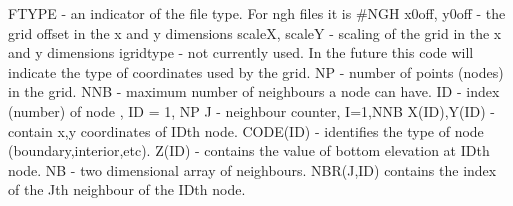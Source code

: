 \documentclass{article}
\begin{document}
\noindent
FTYPE - an indicator of the file type.  For ngh files it is \#NGH \newline
x0off, y0off - the grid offset in the x and y dimensions \newline
scaleX, scaleY - scaling of the grid in the x and y dimensions \newline
igridtype - not currently used.  In the future this code will indicate the type of coordinates used by the grid. \newline
NP - number of points (nodes) in the grid.\newline
NNB - maximum number of neighbours a node can have.\newline
ID - index (number) of node , ID = 1, NP\newline
J  - neighbour counter, I=1,NNB\newline
X(ID),Y(ID) - contain x,y coordinates of IDth node.\newline
CODE(ID) - identifies the type of node (boundary,interior,etc).\newline
Z(ID) - contains the value of bottom elevation at IDth node.\newline
NB - two dimensional array of neighbours.\newline
NBR(J,ID) contains the index of the Jth neighbour of the IDth node.

\newpage
\end{document}
